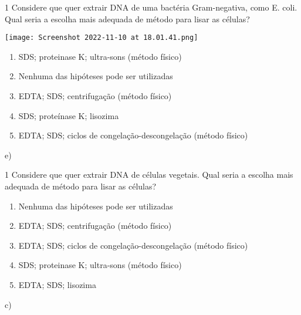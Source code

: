 \documentclass[\mainfilename]{subfiles}
\begin{document}
\begin{questionBox}1{ %
    Considere que quer extrair DNA de uma bactéria Gram-negativa, como E. coli. Qual seria a escolha mais adequada de método para lisar as células?
} %

    \begin{center}
        \texttt{[image: Screenshot 2022-11-10 at 18.01.41.png]}
    \end{center}
    
    \begin{enumerate}[label=\alph{enumi}.]
        \item SDS; proteinase K; ultra-sons (método físico) 
        \item Nenhuma das hipóteses pode ser utilizadas 
        \item EDTA; SDS; centrifugação (método físico)
        \item SDS; proteínase K; lisozima
        \item EDTA; SDS; ciclos de congelação-descongelação (método físico)
    \end{enumerate}

    e)

\end{questionBox}

\begin{questionBox}1{ %
    Considere que quer extrair DNA de células vegetais. Qual seria a escolha mais adequada de método para lisar as células?
} %
    
    \begin{enumerate}[label=\alph{enumi}.]
        \item Nenhuma das hipóteses pode ser utilizadas
        \item EDTA; SDS; centrifugação (método físico)
        \item EDTA; SDS; ciclos de congelação-descongelação (método físico) 
        \item SDS; proteinase K; ultra-sons (método físico)
        \item EDTA; SDS; lisozima
    \end{enumerate}

    c)

\end{questionBox}
\end{document}
